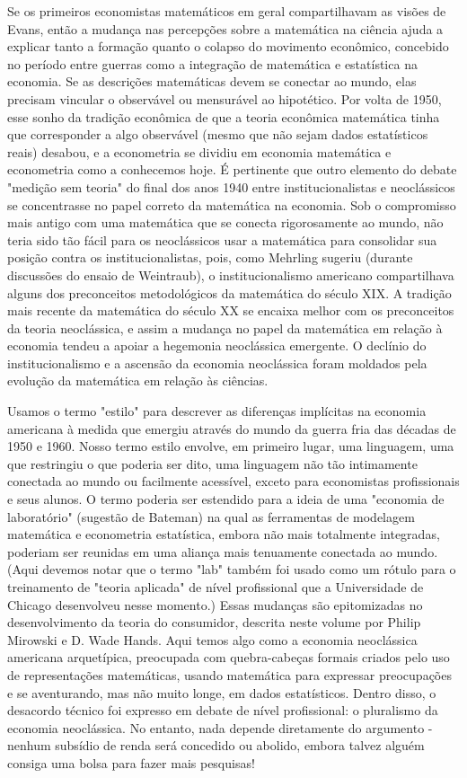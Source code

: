 \documentclass[a4paper,12pt]{article}[abntex2]
\begin{document}
Se os primeiros economistas matemáticos em geral compartilhavam as visões de Evans, então a mudança nas percepções sobre a matemática na ciência ajuda a explicar tanto a formação quanto o colapso do movimento econômico, concebido no período entre guerras como a integração de matemática e estatística na economia. Se as descrições matemáticas devem se conectar ao mundo, elas precisam vincular o observável ou mensurável ao hipotético. Por volta de 1950, esse sonho da tradição econômica de que a teoria econômica matemática tinha que corresponder a algo observável (mesmo que não sejam dados estatísticos reais) desabou, e a econometria se dividiu em economia matemática e econometria como a conhecemos hoje. É pertinente que outro elemento do debate "medição sem teoria" do final dos anos 1940 entre institucionalistas e neoclássicos se concentrasse no papel correto da matemática na economia. Sob o compromisso mais antigo com uma matemática que se conecta rigorosamente ao mundo, não teria sido tão fácil para os neoclássicos usar a matemática para consolidar sua posição contra os institucionalistas, pois, como Mehrling sugeriu (durante discussões do ensaio de Weintraub), o institucionalismo americano compartilhava alguns dos preconceitos metodológicos da matemática do século XIX. A tradição mais recente da matemática do século XX se encaixa melhor com os preconceitos da teoria neoclássica, e assim a mudança no papel da matemática em relação à economia tendeu a apoiar a hegemonia neoclássica emergente. O declínio do institucionalismo e a ascensão da economia neoclássica foram moldados pela evolução da matemática em relação às ciências.

Usamos o termo "estilo" para descrever as diferenças implícitas na economia americana à medida que emergiu através do mundo da guerra fria das décadas de 1950 e 1960. Nosso termo estilo envolve, em primeiro lugar, uma linguagem, uma que restringiu o que poderia ser dito, uma linguagem não tão intimamente conectada ao mundo ou facilmente acessível, exceto para economistas profissionais e seus alunos. O termo poderia ser estendido para a ideia de uma "economia de laboratório" (sugestão de Bateman) na qual as ferramentas de modelagem matemática e econometria estatística, embora não mais totalmente integradas, poderiam ser reunidas em uma aliança mais tenuamente conectada ao mundo. (Aqui devemos notar que o termo "lab" também foi usado como um rótulo para o treinamento de "teoria aplicada" de nível profissional que a Universidade de Chicago desenvolveu nesse momento.) Essas mudanças são epitomizadas no desenvolvimento da teoria do consumidor, descrita neste volume por Philip Mirowski e D. Wade Hands. Aqui temos algo como a economia neoclássica americana arquetípica, preocupada com quebra-cabeças formais criados pelo uso de representações matemáticas, usando matemática para expressar preocupações e se aventurando, mas não muito longe, em dados estatísticos. Dentro disso, o desacordo técnico foi expresso em debate de nível profissional: o pluralismo da economia neoclássica. No entanto, nada depende diretamente do argumento - nenhum subsídio de renda será concedido ou abolido, embora talvez alguém consiga uma bolsa para fazer mais pesquisas!
\end{document}
